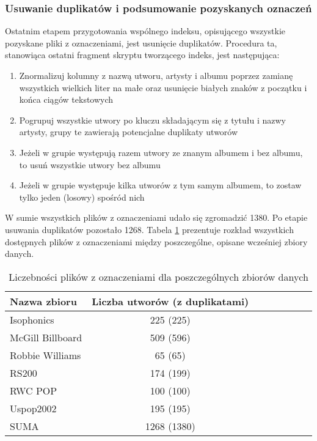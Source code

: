 \subsubsection{Usuwanie duplikatów i podsumowanie pozyskanych oznaczeń}

Ostatnim etapem przygotowania wspólnego indeksu, opisującego wszystkie pozyskane pliki z
oznaczeniami, jest usunięcie duplikatów. Procedura ta, stanowiąca ostatni fragment skryptu
tworzącego indeks, jest następująca:

\begin{enumerate}
    \item Znormalizuj kolumny z nazwą utworu, artysty i albumu poprzez zamianę wszystkich wielkich
        liter na małe oraz usunięcie białych znaków z początku i końca ciągów tekstowych
    \item Pogrupuj wszystkie utwory po kluczu składającym się z tytułu i nazwy artysty, grupy te
        zawierają potencjalne duplikaty utworów
    \item Jeżeli w grupie występują razem utwory ze znanym albumem i bez albumu, to usuń wszystkie
        utwory bez albumu
    \item Jeżeli w grupie występuje kilka utworów z tym samym albumem, to zostaw tylko jeden
        (losowy) spośród nich
\end{enumerate}

W sumie wszystkich plików z oznaczeniami udało się zgromadzić 1380. Po etapie usuwania duplikatów
pozostało 1268. Tabela \ref{tab:datasets1} prezentuje rozkład wszystkich dostępnych plików z
oznaczeniami między poszczególne, opisane wcześniej zbiory danych.

\begin{table}
    \centering
    \caption{Liczebności plików z oznaczeniami dla poszczególnych zbiorów danych}
    \label{tab:datasets1}
    \begin{tabular}{|l|c|c|c|c|c|c|c|} \hline
        Nazwa zbioru & Liczba utworów (z duplikatami) \\ \hline
        Isophonics & 225 (225) \\
        McGill Billboard & 509 (596) \\
        Robbie Williams & 65 (65) \\
        RS200 & 174 (199) \\
        RWC POP & 100 (100) \\
        Uspop2002 & 195 (195) \\
        SUMA & 1268 (1380) \\ \hline
    \end{tabular}
\end{table}


